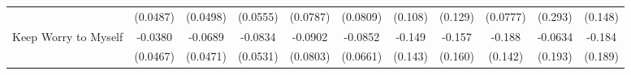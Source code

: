 {\begin{tabular}{l*{10}{c}}
            &    (0.0487)         &    (0.0498)         &    (0.0555)         &    (0.0787)         &    (0.0809)         &     (0.108)         &     (0.129)         &    (0.0777)         &     (0.293)         &     (0.148)         \\
\addlinespace
Keep Worry to Myself&     -0.0380         &     -0.0689         &     -0.0834         &     -0.0902         &     -0.0852         &      -0.149         &      -0.157         &      -0.188         &     -0.0634         &      -0.184         \\
            &    (0.0467)         &    (0.0471)         &    (0.0531)         &    (0.0803)         &    (0.0661)         &     (0.143)         &     (0.160)         &     (0.142)         &     (0.193)         &     (0.189)         \\
\bottomrule
\end{tabular}
}
